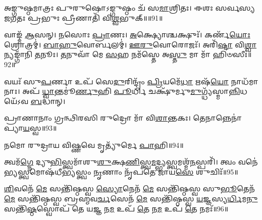 𑌅𑌙𑍍𑌗𑍁𑌷𑍍𑌠𑌮𑌾𑌤𑍍𑌰𑌃 𑌪𑍁𑌰𑍁𑌷𑍋𑌽𑌙𑍍𑌗𑍁𑌷𑍍𑌠𑌂 𑌚᳴ 𑌸\-\ul{𑌮𑌾}\-𑌶𑍍𑌰𑌿𑌤𑌃। 
𑌈𑌶𑌃 𑌸𑌰𑍍𑌵𑌸𑍍𑌯 𑌜𑌗𑌤𑌃 𑌪𑍍𑌰𑌭𑍁𑌃 𑌪𑍍𑌰𑍀𑌣𑌾𑌤𑌿᳴ 𑌵𑌿\-\ul{𑌶𑍍𑌵}\-𑌭𑍁𑌕𑍍॥॥91॥\anuvakamend

𑌵𑌾𑌙𑍍𑌮᳴ \ul{𑌆}\-𑌸𑌨𑍍। 
\-\ul{𑌨}\-𑌸𑍋𑌃 \ul{𑌪𑍍𑌰𑌾}\-𑌣𑌃। 
\-\ul{𑌅}\-𑌕𑍍𑌷𑍍𑌯𑍋𑌶𑍍𑌚𑌕𑍍𑌷𑍁𑌃᳴। 
𑌕𑌰𑍍𑌣᳴\-\ul{𑌯𑍋𑌃} 𑌶𑍍𑌰𑍋𑌤𑍍𑌰𑌮𑍍॑। 
\-\ul{𑌬𑌾}\-\-\ul{𑌹𑍁}\-𑌵𑍋𑌰𑍍𑌬𑌲𑌮𑍍॑। 
\-\ul{𑌊}\-\-\ul{𑌰𑍁}\-𑌵𑍋𑌰𑍋𑌜𑌃᳴। 
𑌅𑌰𑌿᳴\-\ul{𑌷𑍍𑌟𑌾} 𑌵𑌿\-\ul{𑌶𑍍𑌵𑌾}\-𑌨𑍍𑌯𑌙𑍍𑌗𑌾᳴𑌨𑌿 \ul{𑌤}\-𑌨𑍂𑌃। 
\-\ul{𑌤}\-𑌨𑍁𑌵𑌾᳴ 𑌮𑍇 \ul{𑌸}\-𑌹 𑌨𑌮᳴𑌸𑍍𑌤𑍇 𑌅\-\ul{𑌸𑍍𑌤𑍁} 𑌮𑌾 𑌮𑌾᳴ 𑌹𑌿𑍞𑌸𑍀𑌃॥92॥\anuvakamend

𑌵𑌯𑌃᳴ 𑌸𑍁\-\ul{𑌪}\-𑌰𑍍𑌣𑌾 𑌉𑌪᳴ 𑌸𑍇\-\ul{𑌦𑍁}\-𑌰𑌿𑌨𑍍𑌦𑍍𑌰𑌂᳴ \ul{𑌪𑍍𑌰𑌿}\-𑌯𑌮𑍇᳴\-\ul{𑌧𑌾} 𑌋𑌷᳴\-\ul{𑌯𑍋} 𑌨𑌾𑌧᳴𑌮𑌾𑌨𑌾𑌃। 
𑌅𑌪᳴ \ul{𑌧𑍍𑌵𑌾}\-𑌨𑍍𑌤𑌮𑍂॑\-\ul{𑌰𑍍𑌣𑍁}\-𑌹𑌿 \ul{𑌪𑍂}\-𑌰𑍍𑌧𑌿 𑌚𑌕𑍍𑌷𑍁᳴𑌰𑍍𑌮𑍁\-\ul{𑌮𑍁}\-𑌗𑍍𑌧𑍍𑌯᳴𑌸𑍍𑌮𑌾\-\ul{𑌨𑍍𑌨𑌿}\-𑌧𑌯𑍇᳴𑌽𑌵 \ul{𑌬}\-𑌦𑍍𑌧𑌾𑌨𑍍।\anuvakamend

𑌪𑍍𑌰𑌾𑌣𑌾𑌨𑌾𑌂 𑌗𑍍𑌰𑌨𑍍𑌥𑌿𑌰𑌸𑌿 𑌰𑍁𑌦𑍍𑌰𑍋 𑌮𑌾᳴ 𑌵𑌿\-\ul{𑌶𑌾}\-𑌨𑍍𑌤𑌕𑌃। 
𑌤𑍇𑌨𑌾𑌨𑍍𑌨𑍇𑌨𑌾॑𑌪𑍍𑌯𑌾\-\-\ul{𑌯}\-𑌸𑍍𑌵॥93॥\anuvakamend

𑌨𑌮𑍋 𑌰𑍁𑌦𑍍𑌰𑌾𑌯 𑌵𑌿𑌷𑍍𑌣𑌵𑍇 𑌮𑍃𑌤𑍍𑌯𑍁᳴𑌰𑍍𑌮𑍇 \ul{𑌪𑌾}\-𑌹𑌿॥94॥\anuvakamend


𑌤𑍍𑌵𑌮᳴\-\ul{𑌗𑍍𑌨𑍇} 𑌦𑍍𑌯𑍁\-\ul{𑌭𑌿}\-𑌸𑍍𑌤𑍍𑌵𑌮𑌾᳴𑌶𑍁\-\ul{𑌶𑍁}\-𑌕𑍍𑌷\-\ul{𑌣𑌿}\-𑌸𑍍𑌤𑍍𑌵\-\ul{𑌮}\-𑌦𑍍𑌭𑍍𑌯𑌸𑍍𑌤𑍍𑌵𑌮𑌶𑍍𑌮᳴\-\ul{𑌨}\-𑌸𑍍𑌪𑌰𑌿᳴। 
𑌤𑍍𑌵𑌂 𑌵𑌨𑍇॑\-\ul{𑌭𑍍𑌯}\-𑌸𑍍𑌤𑍍𑌵𑌮𑍋𑌷᳴𑌧𑍀\-\ul{𑌭𑍍𑌯}\-𑌸𑍍𑌤𑍍𑌵𑌂 \ul{𑌨𑍃}\-𑌣𑌾𑌂 𑌨𑍃᳴𑌪𑌤𑍇 𑌜𑌾𑌯\-\ul{𑌸𑍇} 𑌶𑍁𑌚𑌿𑌃᳴॥95॥\anuvakamend

\-\ul{𑌶𑌿}\-𑌵𑌨𑍇᳴ \ul{𑌮𑍇} 𑌸𑌨𑍍𑌤𑌿᳴𑌷𑍍𑌠𑌸𑍍𑌵 \ul{𑌸𑍍𑌯𑍋}\-𑌨𑍇𑌨᳴  \ul{𑌮𑍇} 𑌸𑌨𑍍𑌤𑌿᳴𑌷𑍍𑌠𑌸𑍍𑌵 𑌸𑍁\-\ul{𑌭𑍂}\-𑌤𑍇𑌨᳴  \ul{𑌮𑍇} 𑌸𑌨𑍍𑌤𑌿᳴𑌷𑍍𑌠𑌸𑍍𑌵 𑌬𑍍𑌰𑌹𑍍𑌮𑌵\-\ul{𑌰𑍍𑌚}\-𑌸𑍇𑌨᳴  \ul{𑌮𑍇} 𑌸𑌨𑍍𑌤𑌿᳴𑌷𑍍𑌠𑌸𑍍𑌵 \ul{𑌯}\-𑌜𑍍𑌞𑌸𑍍𑌯\-\ul{𑌰𑍍𑌧𑌿}\-𑌮\-\ul{𑌨𑍁} 𑌸𑌨𑍍𑌤𑌿᳴\-\ul{𑌷𑍍𑌠}\-𑌸𑍍𑌵𑍋𑌪᳴ 𑌤𑍇 𑌯\-\ul{𑌜𑍍𑌞} 𑌨\-\ul{𑌮} 𑌉𑌪᳴ \ul{𑌤𑍇} 𑌨\-\ul{𑌮} 𑌉𑌪᳴ \ul{𑌤𑍇} 𑌨𑌮𑌃᳴॥96॥\anuvakamend

